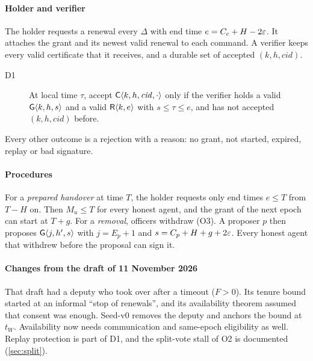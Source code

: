\paragraph{Holder and verifier}
The holder requests a renewal every $\Delta$ with end time $e = C_c + H - 2\varepsilon$. It
attaches the grant and its newest valid renewal to each command. A verifier keeps every
valid certificate that it receives, and a durable set of accepted $(k, h, \mathit{cid})$.
\begin{description}
  \item[D1] At local time $\tau$, accept $\mathsf{C}\langle k, h, \mathit{cid}, \cdot\rangle$ only if the
  verifier holds a valid $\mathsf{G}\langle k, h, s\rangle$ and a valid $\mathsf{R}\langle k, e\rangle$ with
  $s \le \tau \le e$, and has not accepted $(k, h, \mathit{cid})$ before.
\end{description}
Every other outcome is a rejection with a reason: no grant, not started, expired, replay
or bad signature.

\paragraph{Procedures}
For a \emph{prepared handover} at time $T$, the holder requests only end times $e \le T$
from $T - H$ on. Then $M_u \le T$ for every honest agent, and the grant of the next epoch
can start at $T + g$. For a \emph{removal}, officers withdraw (O3). A proposer $p$ then
proposes $\mathsf{G}\langle j, h', s\rangle$ with $j = E_p + 1$ and $s = C_p + H + g + 2\varepsilon$. Every honest
agent that withdrew before the proposal can sign it.

\paragraph{Changes from the draft of 11 November 2026}
That draft had a deputy who took over after a timeout ($F > 0$). Its tenure bound started
at an informal ``stop of renewals'', and its availability theorem assumed that consent was
enough. Seed-v0 removes the deputy and anchors the bound at $t_W$. Availability now needs
communication and same-epoch eligibility as well. Replay protection is part of D1, and the
split-vote stall of O2 is documented (\cref{sec:split}).
